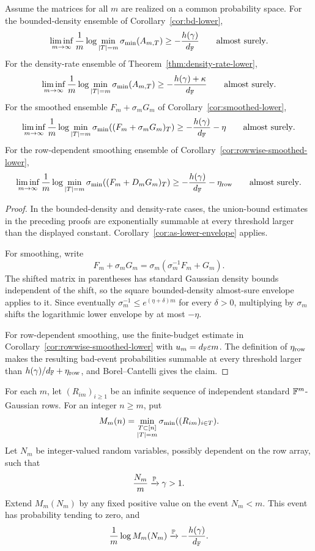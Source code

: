 \begin{corollary}\label{cor:as-square-lower-envelope}
Assume the matrices for all \(m\) are realized on a common probability space.
For the bounded-density ensemble of Corollary~\ref{cor:bd-lower},
\[
  \liminf_{m\to\infty}\frac1m
  \log\min_{|T|=m}\sigma_{\min}(A_{m,T})
  \ge -\frac{h(\gamma)}{d_{\mathbb{F}}}
  \qquad\hbox{almost surely}.
\]
For the density-rate ensemble of Theorem~\ref{thm:density-rate-lower},
\[
  \liminf_{m\to\infty}\frac1m
  \log\min_{|T|=m}\sigma_{\min}(A_{m,T})
  \ge -\frac{h(\gamma)+\kappa}{d_{\mathbb{F}}}
  \qquad\hbox{almost surely}.
\]
For the smoothed ensemble \(F_m+\sigma_mG_m\) of
Corollary~\ref{cor:smoothed-lower},
\[
  \liminf_{m\to\infty}\frac1m
  \log\min_{|T|=m}\sigma_{\min}((F_m+\sigma_mG_m)_T)
  \ge -\frac{h(\gamma)}{d_{\mathbb{F}}}-\eta
  \qquad\hbox{almost surely}.
\]
For the row-dependent smoothing ensemble of
Corollary~\ref{cor:rowwise-smoothed-lower},
\[
  \liminf_{m\to\infty}\frac1m
  \log\min_{|T|=m}\sigma_{\min}((F_m+D_mG_m)_T)
  \ge -\frac{h(\gamma)}{d_{\mathbb{F}}}-\eta_{\rm row}
  \qquad\hbox{almost surely}.
\]
\end{corollary}

\begin{proof}
In the bounded-density and density-rate cases, the union-bound estimates in
the preceding proofs are exponentially summable at every threshold larger than
the displayed constant.  Corollary~\ref{cor:as-lower-envelope} applies.

For smoothing, write
\[
  F_m+\sigma_mG_m=\sigma_m(\sigma_m^{-1}F_m+G_m).
\]
The shifted matrix in parentheses has standard Gaussian density bounds
independent of the shift, so the square bounded-density almost-sure envelope
applies to it.  Since eventually
\(\sigma_m^{-1}\le e^{(\eta+\delta)m}\) for every \(\delta>0\), multiplying by
\(\sigma_m\) shifts the logarithmic lower envelope by at most \(-\eta\).

For row-dependent smoothing, use the finite-budget estimate in
Corollary~\ref{cor:rowwise-smoothed-lower} with
\(u_m=d_{\mathbb{F}}\varepsilon m\).  The definition of \(\eta_{\rm row}\) makes the
resulting bad-event probabilities summable at every threshold larger than
\(h(\gamma)/d_{\mathbb{F}}+\eta_{\rm row}\), and Borel--Cantelli gives the claim.
\end{proof}

\begin{theorem}\label{thm:random-row-count-gaussian}
For each \(m\), let \((R_{im})_{i\ge1}\) be an infinite sequence of independent
standard \(\mathbb{F}^m\)-Gaussian rows.  For an integer \(n\ge m\), put
\[
  M_m(n)=\min_{\substack{T\subset[n]\\ |T|=m}}\sigma_{\min}((R_{im})_{i\in T}).
\]
Let \(N_m\) be integer-valued random variables, possibly dependent on the row
array, such that
\[
  \frac{N_m}{m}\xrightarrow{\mathbb{P}}\gamma>1 .
\]
Extend \(M_m(N_m)\) by any fixed positive value on the event \(N_m<m\).  This
event has probability tending to zero, and
\[
  \frac1m\log M_m(N_m)\xrightarrow{\mathbb{P}}-\frac{h(\gamma)}{d_{\mathbb{F}}}.
\]
\end{theorem}

